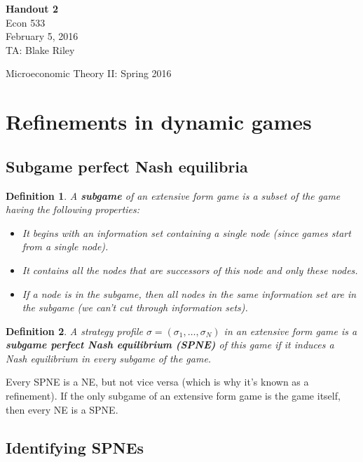 \documentclass[10pt]{article}
\theoremstyle{basic}
\newtheorem{definition}{Definition}[section]
\begin{document}
\begin{spacing}{1.0}

\noindent
\textbf{Handout 2} \\
Econ 533 \\
February 5, 2016 \\
TA: Blake Riley \\

\begin{center}
{\Large Microeconomic Theory II: Spring 2016}
\end{center}

\section{Refinements in dynamic games}

\subsection{Subgame perfect Nash equilibria}

\begin{definition}
  A \textbf{subgame} of an extensive form game is a subset of the
  game having the following properties:
  \begin{itemize}
  \item It begins with an information set containing a
    single node (since games start from a single node).
  \item It contains all the nodes that are successors of
    this node and only these nodes.
  \item If a node is in the subgame, then all nodes in
    the same information set are in the subgame (we can't
    cut through information sets).
  \end{itemize}
\end{definition}

\begin{definition}
  A strategy profile $\sigma = (\sigma_1, \ldots, \sigma_N)$ in an
  extensive form game is a \textbf{subgame perfect Nash equilibrium (SPNE)}
  of this game if it induces a Nash equilibrium in every subgame of the
  game.
\end{definition}

Every SPNE is a NE, but not vice versa (which is why it's known as a
refinement). If the only subgame of an extensive form game is the game
itself, then every NE is a SPNE.

\subsection{Identifying SPNEs}


\end{spacing}
\end{document}
